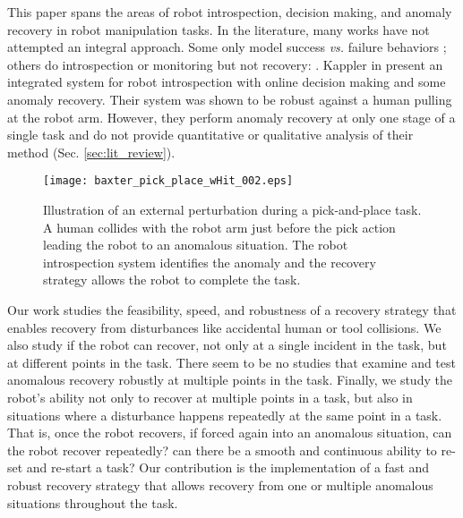 \documentclass[letterpaper, 10 pt, conference]{ieeeconf}  %
\begin{document}
This paper spans the areas of robot introspection, decision making, and anomaly recovery in robot manipulation tasks. In the literature, many works have not attempted an integral approach. Some only model success \textit{vs.} failure behaviors \cite{2014ICRA-Rojas-EarlyFC,2011IROS-Rodriguez-AbortRetry}; others do introspection or monitoring but not recovery: \cite{2013IROS-Nakamura-ErrorRecTaskStrat,2013IROS-DiLello-BayesianContFaultDetection,2016ICRA-Park-MultiModalMonitoringAnomalyDet_RobotManip,2017iros-rojas-onlinewrenchintrospection}. Kappler \et in \cite{2015RSS-Kappler-DateDrivenOnlineDecisionMakingManipu} present an integrated system for robot introspection with online decision making and some anomaly recovery. Their system was shown to be robust against a human pulling at the robot arm. However, they perform anomaly recovery at only one stage of a single task and do not provide quantitative or qualitative analysis of their method (Sec. \ref{sec:lit_review}). 
\begin{figure}[t]    
	\centering		
		\texttt{[image: baxter\_pick\_place\_wHit\_002.eps]}
		\caption{Illustration of an external perturbation during a pick-and-place task. A human collides with the robot arm just before the pick action leading the robot to an anomalous situation. The robot introspection system identifies the anomaly and the recovery strategy allows the robot to complete the task.}
        \label{fig:exp_setup}        
\end{figure}

Our work studies the feasibility, speed, and robustness of a recovery strategy that enables recovery from disturbances like accidental human or tool collisions. We also study if the robot can recover, not only at a single incident in the task, but at different points in the task. There seem to be no studies that examine and test anomalous recovery robustly at multiple points in the task. Finally, we study the robot's ability not only to recover at multiple points in a task, but also in situations where a disturbance happens repeatedly at the same point in a task. That is, once the robot recovers, if forced again into an anomalous situation, can the robot recover repeatedly? \Ie can there be a smooth and continuous ability to re-set and re-start a task? Our contribution is the implementation of a fast and robust recovery strategy that allows recovery from one or multiple anomalous situations throughout the task. 
\end{document}
